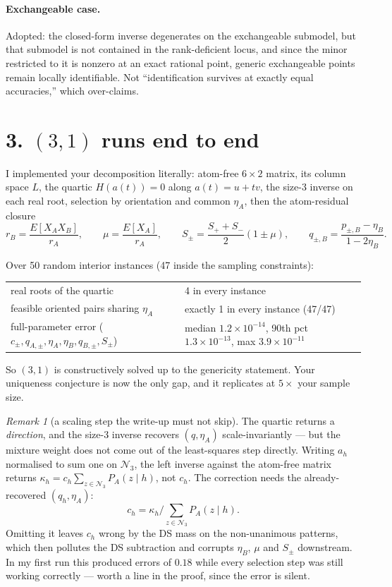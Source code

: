 \documentclass[11pt]{article}
\theoremstyle{remark}
\newtheorem*{remark}{Remark}
\newcommand{\N}{\mathcal{N}_3}
\begin{document}
\paragraph{Exchangeable case.} Adopted: the closed-form inverse degenerates on the exchangeable submodel, but that submodel is not contained in the rank-deficient locus, and since the minor restricted to it is nonzero at an exact rational point, generic exchangeable points remain locally identifiable. Not ``identification survives at exactly equal accuracies,'' which over-claims.

\section*{3. $(3,1)$ runs end to end}

I implemented your decomposition literally: atom-free $6\times2$ matrix, its column space $L$, the quartic $H(a(t))=0$ along $a(t)=u+tv$, the size-3 inverse on each real root, selection by orientation and common $\eta_A$, then the atom-residual closure
\[
r_B=\frac{E[X_AX_B]}{r_A},\qquad \mu=\frac{E[X_A]}{r_A},\qquad S_\pm=\frac{S_++S_-}{2}(1\pm\mu),\qquad q_{\pm,B}=\frac{p_{\pm,B}-\eta_B}{1-2\eta_B}.
\]

Over 50 random interior instances (47 inside the sampling constraints):

\begin{center}\small
\begin{tabular}{@{}ll@{}}
\toprule
real roots of the quartic & 4 in every instance\\
feasible oriented pairs sharing $\eta_A$ & exactly 1 in every instance (47/47)\\
full-parameter error ($c_\pm,q_{A,\pm},\eta_A,\eta_B,q_{B,\pm},S_\pm$) & median $1.2\times10^{-14}$, 90th pct $1.3\times10^{-13}$, max $3.9\times10^{-11}$\\
\bottomrule
\end{tabular}
\end{center}

So $(3,1)$ is constructively solved up to the genericity statement. Your uniqueness conjecture is now the only gap, and it replicates at $5\times$ your sample size.

\begin{remark}[a scaling step the write-up must not skip]
The quartic returns a \emph{direction}, and the size-3 inverse recovers $(q,\eta_A)$ scale-invariantly --- but the mixture weight does not come out of the least-squares step directly. Writing $a_h$ normalised to sum one on $\N$, the left inverse against the atom-free matrix returns $\kappa_h=c_h\sum_{z\in\N}P_A(z\mid h)$, not $c_h$. The correction needs the already-recovered $(q_h,\eta_A)$:
\[
c_h=\kappa_h\Big/\sum_{z\in\N}P_A(z\mid h).
\]
Omitting it leaves $c_h$ wrong by the DS mass on the non-unanimous patterns, which then pollutes the DS subtraction and corrupts $\eta_B$, $\mu$ and $S_\pm$ downstream. In my first run this produced errors of $0.18$ while every selection step was still working correctly --- worth a line in the proof, since the error is silent.
\end{remark}
\end{document}
